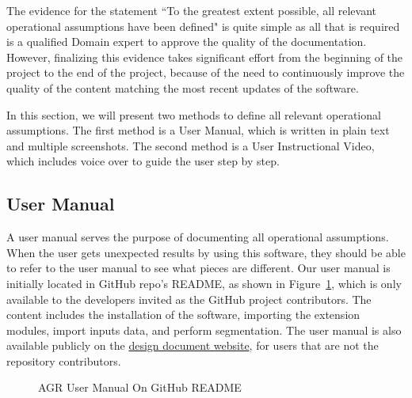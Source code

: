 The evidence for the statement ``To the greatest extent possible, all relevant operational assumptions have been defined" is quite simple as all that is required is a qualified Domain expert to approve the quality of the documentation. However, finalizing this evidence takes significant effort from the beginning of the project to the end of the project, because of the need to continuously improve the quality of the content matching the most recent updates of the software.

In this section, we will present two methods to define all relevant operational assumptions. The first method is a User Manual, which is written in plain text and multiple screenshots. The second method is a User Instructional Video, which includes voice over to guide the user step by step.

\subsection{User Manual}\label{user_manual}
A user manual serves the purpose of documenting all operational assumptions. When the user gets unexpected results by using this software, they should be able to refer to the user manual to see what pieces are different. Our user manual is initially located in GitHub repo's README, as shown in Figure~\ref{fig_agr_git_um}, which is only available to the developers invited as the GitHub project contributors. The content includes the installation of the software, importing the extension modules, import inputs data, and perform segmentation. The user manual is also available publicly on the \href{https://joviel25.github.io/AortaGR-design-document/UserInstructions.html}{design document website}, for users that are not the repository contributors.

\begin{figure}[H]
    \centering
    \caption[AGR User Manual On GitHub README]{AGR User Manual On GitHub README}
    \label{fig_agr_git_um}
\end{figure}


